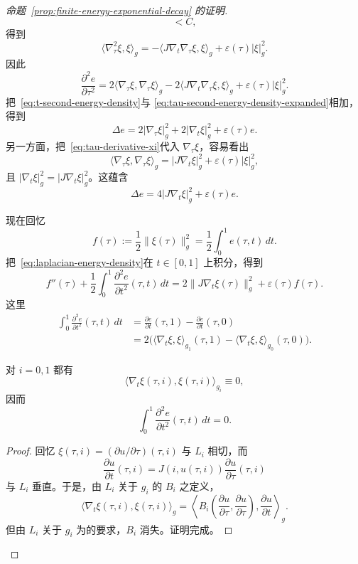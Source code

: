 \begin{proof}[命题~\ref{prop:finite-energy-exponential-decay} 的证明]
\[  <C,
\]
得到
\[
  \langle\nabla_\tau^2\xi,\xi\rangle_g
  =-\langle J\nabla_t\nabla_\tau\xi,\xi\rangle_g
   +\varepsilon(\tau)|\xi|_g^2.
\]
因此
\begin{equation}
  \frac{\partial^2e}{\partial\tau^2}
  =2\langle\nabla_\tau\xi,\nabla_\tau\xi\rangle_g
   -2\langle J\nabla_t\nabla_\tau\xi,\xi\rangle_g
   +\varepsilon(\tau)|\xi|_g^2.
\label{eq:tau-second-energy-density-expanded}
\end{equation}
把~\eqref{eq:t-second-energy-density}与
\eqref{eq:tau-second-energy-density-expanded}相加，得到
\[
  \Delta e
  =2|\nabla_\tau\xi|_g^2
   +2|\nabla_t\xi|_g^2
   +\varepsilon(\tau)e.
\]
另一方面，把~\eqref{eq:tau-derivative-xi}代入 $\nabla_\tau\xi$，容易看出
\[
  \langle\nabla_\tau\xi,\nabla_\tau\xi\rangle_g
  =|J\nabla_t\xi|_g^2+\varepsilon(\tau)|\xi|_g^2,
\]
且 $|\nabla_t\xi|_g^2=|J\nabla_t\xi|_g^2$。这蕴含
\begin{equation}
  \Delta e=4|J\nabla_t\xi|_g^2+\varepsilon(\tau)e.
\label{eq:laplacian-energy-density}
\end{equation}

现在回忆
\[
  f(\tau):=\frac12\|\xi(\tau)\|_g^2
  =\frac12\int_0^1e(\tau,t)\,dt.
\]
把~\eqref{eq:laplacian-energy-density}在 $t\in[0,1]$ 上积分，得到
\[
  f''(\tau)
  +\frac12\int_0^1\frac{\partial^2e}{\partial t^2}(\tau,t)\,dt
  =2\|J\nabla_t\xi(\tau)\|_g^2+\varepsilon(\tau)f(\tau).
\]
这里
\[
  \begin{aligned}
  \int_0^1\frac{\partial^2e}{\partial t^2}(\tau,t)\,dt
  &=\frac{\partial e}{\partial t}(\tau,1)
    -\frac{\partial e}{\partial t}(\tau,0)\\
  &=2\bigl(
      \langle\nabla_t\xi,\xi\rangle_{g_1}(\tau,1)
      -\langle\nabla_t\xi,\xi\rangle_{g_0}(\tau,0)
    \bigr).
  \end{aligned}
\]

\begin{lemma}
\label{lem:boundary-second-derivative-vanishes}
对 $i=0,1$ 都有
\[
  \langle\nabla_t\xi(\tau,i),\xi(\tau,i)\rangle_{g_i}\equiv0,
\]
因而
\[
  \int_0^1\frac{\partial^2e}{\partial t^2}(\tau,t)\,dt=0.
\]
\end{lemma}

\begin{proof}
回忆 $\xi(\tau,i)=(\partial u/\partial\tau)(\tau,i)$ 与 $L_i$ 相切，而
\[
  \frac{\partial u}{\partial t}(\tau,i)
  =J(i,u(\tau,i))\frac{\partial u}{\partial\tau}(\tau,i)
\]
与 $L_i$ 垂直。于是，由 $L_i$ 关于 $g_i$ 的\termSecondFundamentalForm{} $B_i$
之定义，
\[
  \langle\nabla_t\xi(\tau,i),\xi(\tau,i)\rangle_g
  =\left\langle
    B_i\left(
      \frac{\partial u}{\partial\tau},
      \frac{\partial u}{\partial\tau}
    \right),
    \frac{\partial u}{\partial t}
  \right\rangle_g.
\]
但由 $L_i$ 关于 $g_i$ 为\termTotallyGeodesic{}的要求，$B_i$ 消失。证明完成。
\end{proof}


\end{proof}
